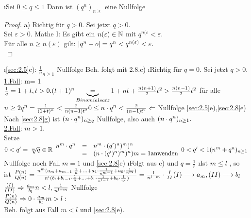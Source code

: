 \begin{enumerate}[a)]
\i Sei $0 \leq q \leq 1$ Dann ist $(q^n)_{n \geq}$ eine Nullfolge
\begin{proof}
a) Richtig für $q > 0$. Sei jetzt $q > 0$.\\
Sei $\varepsilon > 0$. Mathe I: Es gibt ein $n(\varepsilon) \in \mathbb{N}$ mit $q^{n(\varepsilon} < \varepsilon.$\\
Für alle $n \geq n(\varepsilon)$ gilt: $\lvert q^{n} -o \rvert = q^n < q^{n(\varepsilon)} < \varepsilon.$\\
\end{proof}
\i \ref{sec:2.5}c): $\frac{1}{n}_{n \geq 1}$ Nullfolge Beh. folgt mit 2.8.c)
\i Richtig für $q=0$. Sei jetzt $q > 0$.\\
\underline{1.Fall}: m= 1\\
$\frac{1}{q} = 1+t, t > 0.\\
(t+1)^n \underbrace{=}_{Binomialsatz} 1 + nt + \frac{n(n+1)}{2}t^2 > \frac{n(n-1)}{2}t^2$ für alle $n \geq 2\\
q^n = \frac{1}{(1+t)^n} < \frac{2}{n(n-1)t^2}\\
0 \leq n \cdot q^{n} < \frac{2}{(n-1)t^2} \Leftarrow$ Nullfolge \ref{sec:2.5}e),\ref{sec:2.8}e)\\
Nach \ref{sec:2.8}g) ist $(n \cdot q^n)_{n \geq q}$ Nullfolge, also auch $(n \cdot q^n)_{n \geq 1}.$\\
\underline{2.Fall}: $m > 1$.\\
Setze $0 < q' = \sqrt[m]{q} \in \mathbb{R}\\
\begin{array}{rcl}
n^m \cdot q^n &=& n^m \cdot (q')^n)^m)^n\\
&=& (n \cdot (q')^n)^m)^n) m = 1 \text{anwenden}
\end{array}\\
0 < q' < 1\\
(n^m + q^n)_{n \geq 1}$ Nullfolge noch Fall $m=1$ und \ref{sec:2.8}e)
\i Folgt aus c) und $q = \frac{1}{r}$
\i Ist $ m \leq l$ , so ist  $\frac{P(n(}{Q(n)} =\frac{n^m(a_m + a_{m-1}\cdot\frac{1}{n} + \ldots + a_1 \cdot \frac{1}{n^{m-1}} + a_0 \cdot \frac{1}{n^m})}{n^l(b_l + b_{l-1}\cdot\frac{1}{n} + \ldots + b_1 \cdot \frac{1}{n^{l-1}} + b_0 \cdot \frac{1}{n^l})}
= \frac{1}{n^{l-m}} \cdot \frac{I}{II}\\
(I) \longrightarrow a_m , (II) \longrightarrow b_l$
$\frac{(I)}{(II)} \Rightarrow \frac{a_m}{b_l}\\
n < l, \frac{1}{n^{l-m}}$ Nullfolge\\
$\frac{P(n)}{Q(n)} \Rightarrow 0 \cdot \frac{a_m}{b_l}\\
m > l:$\\
Beh. folgt aus Fall $m < l$ und \ref{sec:2.8}e).
\end{enumerate}
